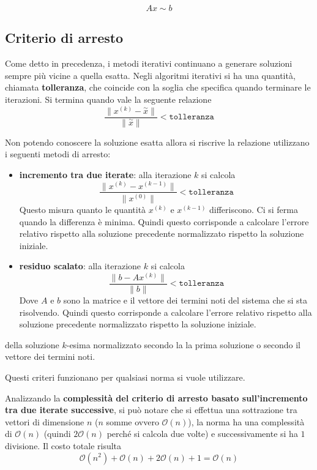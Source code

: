 $$Ax \sim b$$

\subsection{Criterio di arresto}
Come detto in precedenza, i metodi iterativi continuano a generare soluzioni sempre
più vicine a quella esatta.
Negli algoritmi iterativi si ha una quantità, chiamata \textbf{tolleranza}, che
coincide con la soglia che specifica quando terminare le iterazioni. Si termina
quando vale la seguente relazione
$$\frac{\|x^{(k)}-\stackrel{\sim}{x}\|}{\|\stackrel{\sim}{x}\|} < \texttt{tolleranza}$$

Non potendo conoscere la soluzione esatta allora si riscrive la relazione utilizzano i seguenti metodi
di arresto:
\begin{itemize}
    \item \textbf{incremento tra due iterate}: alla iterazione $k$ si calcola
          $$\frac{\|x^{(k)}-x^{(k-1)}\|}{\|x^{(0)}\|}< \texttt{tolleranza}$$
          Questo misura quanto le quantità $x^{(k)}$ e $x^{(k-1)}$ differiscono. Ci si
          ferma quando la differenza è minima. Quindi questo corrisponde a calcolare l'errore relativo rispetto alla soluzione
          precedente normalizzato rispetto la soluzione iniziale.
    \item \textbf{residuo scalato}: alla iterazione $k$ si calcola
          $$\frac{\|b- Ax^{(k)}\|}{\|b\|}< \texttt{tolleranza}$$
          Dove $A$ e $b$ sono la matrice e il vettore dei termini noti del sistema che
          si sta risolvendo. Quindi questo corrisponde a calcolare l'errore relativo rispetto alla soluzione
          precedente normalizzato rispetto la soluzione iniziale.

\end{itemize}

della soluzione $k$-esima
normalizzato secondo la la prima soluzione o secondo il vettore dei termini noti.

\begin{nota}
    Questi criteri funzionano per qualsiasi norma si vuole utilizzare.
\end{nota}

Analizzando la \textbf{complessità del criterio di arresto basato sull'incremento tra due
    iterate successive}, si può notare che si effettua una sottrazione tra vettori
di dimensione $n$ ($n$ somme ovvero $\mathcal{O}(n)$), la norma ha una complessità
di $\mathcal{O}(n)$ (quindi $2\mathcal{O}(n)$ perché si calcola due volte) e
successivamente si ha $1$ divisione.
Il costo totale risulta
$$\mathcal{O}(n^2)+ \mathcal{O}(n)+2\mathcal{O}(n)+1 = \mathcal{O}(n)$$

